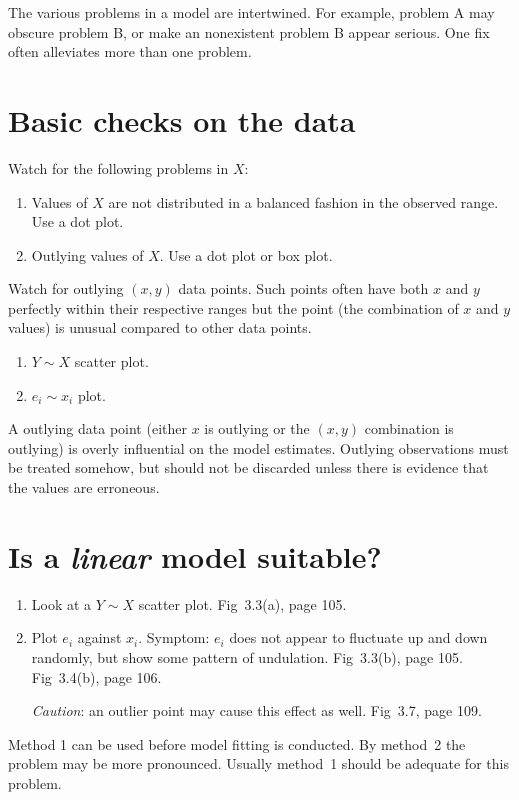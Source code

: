 \documentclass[12pt]{article}
\begin{document}
The various problems in a model are intertwined.
For example,
problem A may obscure problem B,
or make an nonexistent problem B appear serious.
One fix often alleviates more than one problem.


\section{Basic checks on the data}

Watch for the following problems in $X$:
\begin{enumerate}
\item Values of $X$ are not distributed in a balanced fashion
    in the observed range. Use a dot plot.
\item Outlying values of $X$. Use a dot plot or box plot.
\end{enumerate}

Watch for outlying $(x,y)$ data points.
Such points often have both $x$ and $y$ perfectly within
their respective ranges but the point (the combination of $x$ and $y$
values) is unusual compared to other data points.
\begin{enumerate}
\item $Y \sim X$ scatter plot.
\item $e_i \sim x_i$ plot.
\end{enumerate}

A outlying data point (either $x$ is outlying or the $(x,y)$ combination
is outlying) is overly influential on the model estimates.
Outlying observations must be treated somehow,
but should not be discarded
unless there is evidence that the values are erroneous.


\section{Is a \emph{linear} model suitable?}

\begin{enumerate}
\item Look at a $Y \sim X$ scatter plot. Fig~3.3(a), page 105.
\item Plot $e_i$ against $x_i$. Symptom: $e_i$ does not appear to
fluctuate up and down randomly, but show some pattern of undulation.
Fig~3.3(b), page 105. Fig~3.4(b), page 106.

\emph{Caution}: an outlier point may cause this effect as well.
Fig~3.7, page 109.
\end{enumerate}

Method 1 can be used before model fitting is conducted.
By method~2 the problem may be more pronounced.
Usually method~1 should be adequate for this problem.
\end{document}
